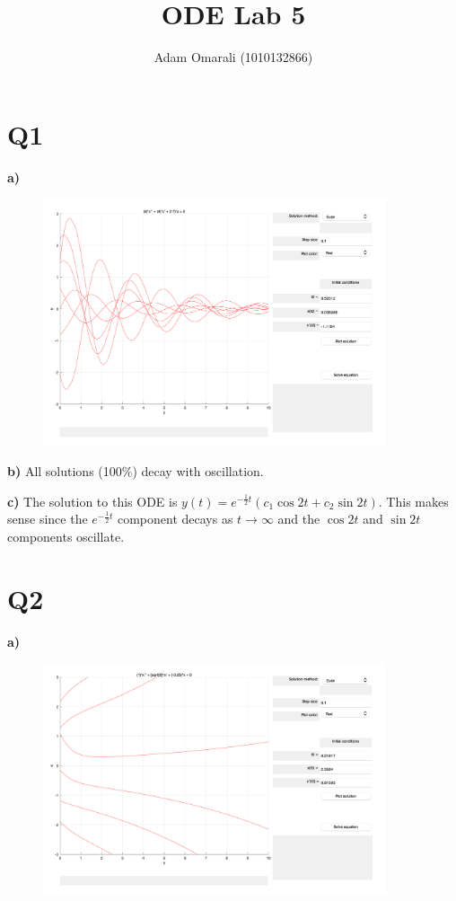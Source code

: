 \documentclass[12pt]{article}
\begin{document}
\title{\bf{ODE Lab 5}}
\author{Adam Omarali (1010132866)}
\maketitle

\section*{Q1}
\textbf{a)}
\begin{figure}[H]
    \centering
    \includegraphics[width=0.9\textwidth]{images/q1.png}
\end{figure}

\textbf{b)}
All solutions (100\%) decay with oscillation.

\textbf{c)}
The solution to this ODE is $y(t) = e^{-\frac{1}{2}t} \left( c_1 \cos 2t + c_2 \sin 2t \right)$.
This makes sense since the $e^{-\frac{1}{2}t}$ component decays as $t \rightarrow \infty$ and the $\cos 2t$ and $\sin 2t$ components oscillate.

\section{Q2}
\textbf{a)}
\begin{figure}[H]
    \centering
    \includegraphics[width=0.9\textwidth]{images/q2.png}
\end{figure}
\end{document}
